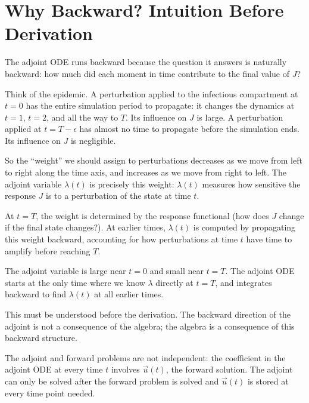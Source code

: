 \section{Why Backward? Intuition Before Derivation}
\label{sec:whybackward}

The adjoint ODE runs backward because the question it answers
is naturally backward: how much did each moment in time contribute
to the final value of $J$?

Think of the epidemic. A perturbation applied to the infectious
compartment at $t = 0$ has the entire simulation period to propagate:
it changes the dynamics at $t = 1$, $t = 2$, and all the way to $T$.
Its influence on $J$ is large. A perturbation applied at $t = T-\epsilon$
has almost no time to propagate before the simulation ends.
Its influence on $J$ is negligible.

So the ``weight'' we should assign to perturbations decreases
as we move from left to right along the time axis,
and increases as we move from right to left.
The adjoint variable $\lambda(t)$ is precisely this weight:
$\lambda(t)$ measures how sensitive the response $J$ is to
a perturbation of the state at time $t$.

At $t = T$, the weight is determined by the response functional
(how does $J$ change if the final state changes?).
At earlier times, $\lambda(t)$ is computed by propagating this
weight backward, accounting for how perturbations at time $t$
have time to amplify before reaching $T$.

The adjoint variable is large near $t = 0$ and small near $t = T$.
The adjoint ODE starts at the only time where we know $\lambda$
directly at $t = T$, and integrates backward to find
$\lambda(t)$ at all earlier times.

This must be understood before the derivation. The backward
direction of the adjoint is not a consequence of the algebra;
the algebra is a consequence of this backward structure.

The adjoint and forward problems are not independent:
the coefficient in the adjoint ODE at every time $t$ involves
$\vec{u}(t)$, the forward solution. The adjoint can only be
solved after the forward problem is solved and $\vec{u}(t)$
is stored at every time point needed.

